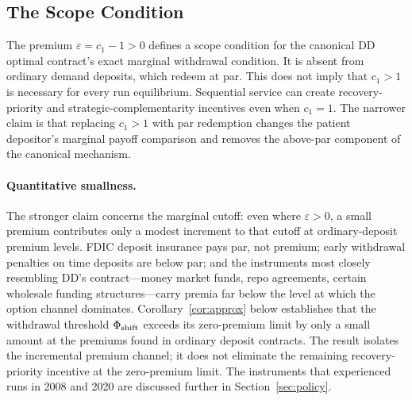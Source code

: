 \documentclass[12pt]{article}\usepackage[]{graphicx}\usepackage[]{xcolor}
\begin{document}
\subsection{The Scope Condition}

The premium $\varepsilon=c_1-1>0$ defines a scope condition for the canonical DD optimal contract's exact marginal withdrawal condition.
It is absent from ordinary demand deposits, which redeem at par.
This does not imply that $c_1>1$ is necessary for every run equilibrium.
Sequential service can create recovery-priority and strategic-complementarity incentives even when $c_1=1$.
The narrower claim is that replacing $c_1>1$ with par redemption changes the patient depositor's marginal payoff comparison and removes the above-par component of the canonical mechanism.

\paragraph{Quantitative smallness.}
The stronger claim concerns the marginal cutoff: even where $\varepsilon > 0$, a small premium contributes only a modest increment to that cutoff at ordinary-deposit premium levels.
FDIC deposit insurance pays par, not premium; early withdrawal penalties on time deposits are below par; and the instruments most closely resembling DD's contract---money market funds, repo agreements, certain wholesale funding structures---carry premia far below the level at which the option channel dominates.
Corollary~\ref{cor:approx} below establishes that the withdrawal threshold $\Phi_{\rm shift}$ exceeds its zero-premium limit by only a small amount at the premiums found in ordinary deposit contracts.
The result isolates the incremental premium channel; it does not eliminate the remaining recovery-priority incentive at the zero-premium limit.
The instruments that experienced runs in 2008 and 2020 are discussed further in Section~\ref{sec:policy}.
\end{document}
